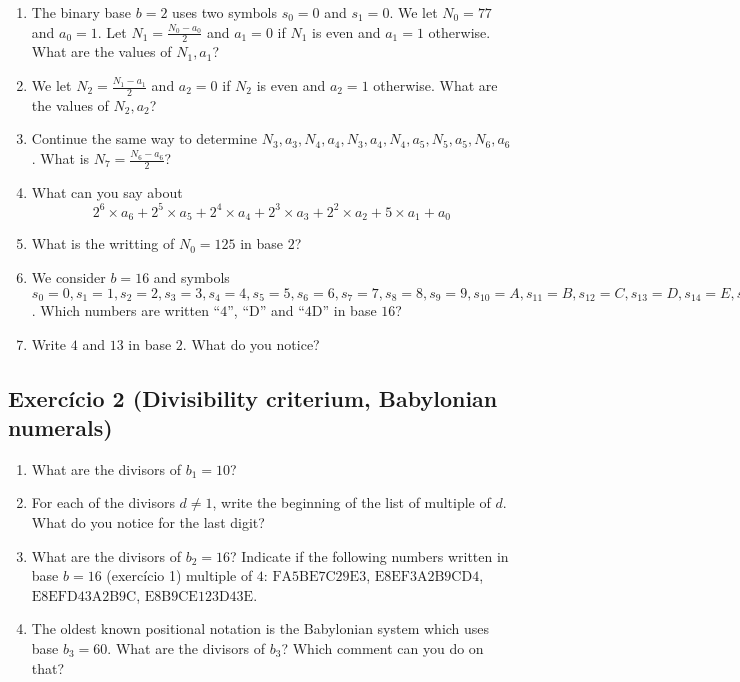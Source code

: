 \begin{enumerate}

\item The binary base $b=2$ uses two symbols $s_0 = 0$ and $s_1 = 0$.
  We let $N_0=77$ and $a_0 = 1$. Let $N_1 = \frac{N_0 - a_0}{2}$ and
  $a_1 = 0$ if $N_1$ is even and $a_1 = 1$ otherwise. What are the values
  of $N_1, a_1$?

\item We let $N_2 = \frac{N_1 - a_1}{2}$ and
  $a_2 = 0$ if $N_2$ is even and $a_2 = 1$ otherwise. What are the values
  of $N_2, a_2$?

\item Continue the same way to determine $N_3, a_3, N_4, a_4, N_3, a_4,
  N_4, a_5, N_5, a_5, N_6, a_6$. What is $N_7 = \frac{N_6-a_6}{2}$?

\item What can you say about
  $${2^6 \times a_6} + {2^5 \times a_5} + {2^4 \times a_4} + {2^3 \times a_3}
  + {2^2 \times a_2} + {5 \times a_1} + a_0$$

\item What is the writting of $N_0 = 125$ in base $2$?

\item We consider $b=16$ and symbols $s_0=0,s_1=1,s_2=2,s_3=3,s_4=4,s_5=5,
  s_6=6,s_7=7,s_8=8,s_9=9,s_{10}=A,s_{11}=B,s_{12}=C,s_{13}=D,s_{14}=E,s_{15}=F$.
  Which numbers are written ``$4$'', ``$\text{D}$'' and ``$4\text{D}$'' in base
  $16$?

\item Write $4$ and $13$ in base $2$. What do you notice?

\end{enumerate}

\subsection*{Exercício 2 (Divisibility criterium, Babylonian numerals)}

\begin{enumerate}
\item What are the divisors of $b_1=10$?
\item For each of the divisors $d\neq1$, write the beginning of the list of
  multiple of $d$. What do you notice for the last digit?
\item What are the divisors of $b_2=16$?
  Indicate if the following numbers written in base $b=16$ (exercício 1)
  multiple of $4$: $\text{FA5BE7C29E3}$, $\text{E8EF3A2B9CD4}$,
  $\text{E8EFD43A2B9C}$, $\text{E8B9CE123D43E}$.
\item The oldest known positional notation is the Babylonian system which uses
  base $b_3=60$. What are the divisors of $b_3$? Which comment
  can you do on that?
\end{enumerate}

